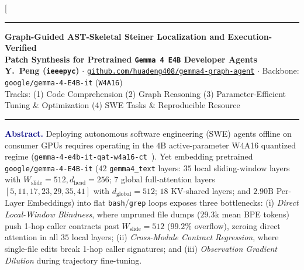 \documentclass[10pt,twocolumn,letterpaper]{article}
\begin{document}
\twocolumn[{%
\begin{@twocolumnfalse}
\begin{center}
    {\color{navy}\rule{\textwidth}{1.5pt}}\vspace{2.0pt}
    {\LARGE\bfseries Graph-Guided AST-Skeletal Steiner Localization and Execution-Verified\\
    Patch Synthesis for Pretrained \texttt{Gemma 4 E4B} Developer Agents}\\[3.5pt]
    {\small
    \textbf{Y.\ Peng (\texttt{ieeepyc})} \quad $\cdot$ \quad
    \href{https://github.com/huadeng408/gemma4-graph-agent}{\texttt{github.com/huadeng408/gemma4-graph-agent}} \quad $\cdot$ \quad
    Backbone: \texttt{google/gemma-4-E4B-it} (\texttt{W4A16})}\\[1.2pt]
    {\scriptsize\textcolor{slate}{Tracks: (1) Code Comprehension \quad (2) Graph Reasoning \quad (3) Parameter-Efficient Tuning \& Optimization \quad (4) SWE Tasks \& Reproducible Resource}}
    \vspace{1.8pt}
    {\color{navy}\rule{\textwidth}{0.8pt}}
\end{center}

\begin{center}
\colorbox{softgray}{%
\begin{minipage}{0.97\textwidth}
\vspace{1.8pt}
\footnotesize
\textbf{\textcolor{navy}{Abstract.}}
Deploying autonomous software engineering (SWE) agents offline on consumer GPUs requires operating in the $4\text{B}$ active-parameter W4A16 quantized regime (\texttt{gemma-4-e4b-it-qat-w4a16-ct}~\cite{gemma4report,gemma4comp}). Yet embedding pretrained \texttt{google/gemma-4-E4B-it} ($42$ \texttt{gemma4\_text} layers: $35$ local sliding-window layers with $W_{\text{slide}}{=}512, d_{\text{head}}{=}256$; $7$ global full-attention layers $[5,11,17,23,29,35,41]$ with $d_{\text{global}}{=}512$; $18$ KV-shared layers; and $2.90\text{B}$ Per-Layer Embeddings) into flat \texttt{bash}/\texttt{grep} loops exposes three bottlenecks: (i) \emph{Direct Local-Window Blindness}, where unpruned file dumps ($29.3\text{k}$ mean BPE tokens) push 1-hop caller contracts past $W_{\text{slide}}{=}512$ ($99.2\%$ overflow), zeroing direct attention in all $35$ local layers; (ii) \emph{Cross-Module Contract Regression}, where single-file edits break 1-hop caller signatures; and (iii) \emph{Observation Gradient Dilution} during trajectory fine-tuning.


\end{minipage}}
\end{center}
\end{@twocolumnfalse}}
\end{document}
